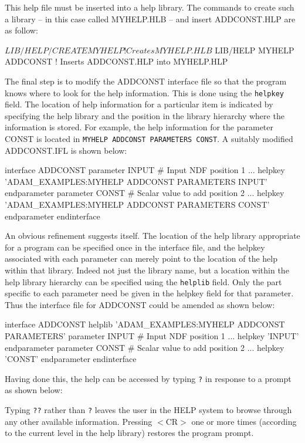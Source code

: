 \documentclass[twoside,11pt,nolof]{starlink}
\begin{document}
This help file must be inserted into a help library.
The commands to create such a library -- in this case called
MYHELP.HLB -- and insert ADDCONST.HLP are as follow:
\begin{terminalv}
$ LIB/HELP/CREATE MYHELP         ! Creates MYHELP.HLB
$ LIB/HELP MYHELP ADDCONST       ! Inserts ADDCONST.HLP into MYHELP.HLP
\end{terminalv}
The final step is to modify the ADDCONST interface file so that the
program knows where to look for the help information.
This is done using the \texttt{helpkey} field.
The location of help information for a particular item is indicated by
specifying the help
library and the position in the library hierarchy where the information is
stored.
For example, the help information for the parameter CONST is located in
\texttt{MYHELP ADDCONST PARAMETERS CONST}.
A  suitably modified ADDCONST.IFL is shown below:
\begin{terminalv}
interface ADDCONST
  parameter      INPUT          # Input NDF
     position    1
     ...
     helpkey     'ADAM_EXAMPLES:MYHELP ADDCONST PARAMETERS INPUT'
  endparameter
  parameter      CONST          # Scalar value to add
     position    2
     ...
     helpkey     'ADAM_EXAMPLES:MYHELP ADDCONST PARAMETERS CONST'
  endparameter
endinterface
\end{terminalv}
An obvious refinement suggests itself. The location of the help library
appropriate for  a program can be specified once in the interface file,
and the helpkey associated with each
parameter can merely point to the location of the help within that library.
Indeed not just the library name, but a location within the help library
hierarchy
can be specified using the \texttt{helplib} field.
Only the part specific to each parameter need be given in the
helpkey field for that parameter.
Thus the interface file for ADDCONST could be amended as shown below:
\begin{terminalv}
interface ADDCONST
  helplib     'ADAM_EXAMPLES:MYHELP ADDCONST PARAMETERS'
  parameter      INPUT          # Input NDF
     position    1
     ...
     helpkey     'INPUT'
  endparameter
  parameter      CONST          # Scalar value to add
      position    2
      ...
     helpkey     'CONST'
  endparameter
endinterface
\end{terminalv}
Having done this, the help can be accessed by typing \texttt{?}
in response to a prompt as shown below:
Typing \texttt{??} rather than \texttt{?} leaves the user in the HELP system
to browse through any other available information. Pressing $<$CR$>$
one or more times (according to the current level in the help library)
restores the program
prompt.
\end{document}
